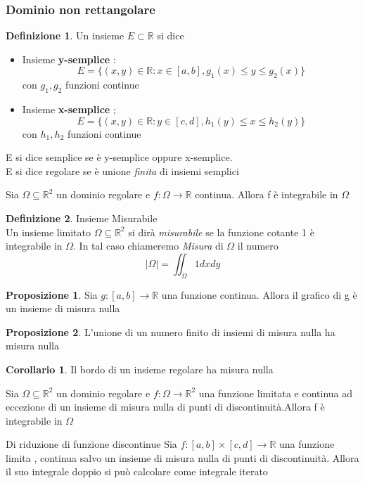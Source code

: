 \documentclass{article}
\theoremstyle{definition}
\newtheorem*{definizione}{Definizione}
\newtheorem*{corollario}{Corollario}
\newtheorem*{proposizione}{Proposizione}
\newcommand{\R}{\mathbb{R}}
\begin{document}
	\subsubsection{Dominio non rettangolare}
	\begin{definizione}
		Un insieme $E \subset \R$ si dice 
		\begin{itemize}
			\item Insieme \textbf{y-semplice} : 
			$$E=\{(x,y)\in \R : x \in [a,b],g_1(x)\leq y \leq g_2(x)\}$$
			con $g_1,g_2$ funzioni continue 
			\item Insieme\textbf{ x-semplice} ;
			$$E=\{(x,y)\in \R : y \in [c,d],h_1(y)\leq x \leq h_2(y)\}$$
			con $h_1,h_2$ funzioni continue 
			
		\end{itemize}
		E si dice semplice se è y-semplice oppure x-semplice.\\
		E si dice regolare se è unione \textit{finita} di insiemi semplici
	\end{definizione}
	\begin{teo}{}{}
		Sia $\Omega \subseteq \R^2$ un dominio regolare e $f : \Omega \rightarrow \R$ continua. Allora f è integrabile in $\Omega$
	\end{teo}
	\begin{definizione}
		Insieme Misurabile \\
		Un insieme limitato $\Omega \subseteq \R^2$ si dirà \textit{misurabile} se la funzione cotante 1 è integrabile in $\Omega$. In tal caso chiameremo \textit{Misura} di $\Omega$ il numero $$|\Omega|=\iint_{\Omega}1dxdy$$
	\end{definizione}
	\begin{proposizione}
		Sia $g:[a,b]\rightarrow\R $ una funzione continua. Allora il grafico di g è un insieme di misura  nulla
	\end{proposizione}
	\begin{proposizione}
		L'unione di un numero finito di insiemi di misura nulla ha misura nulla
	\end{proposizione}
	\begin{corollario}
		Il bordo di un insieme  regolare ha misura nulla 
	\end{corollario}
	\begin{teo}{}{}
		Sia $\Omega\subseteq \R^2$ un dominio regolare e $f:\Omega \rightarrow \R^2$ una funzione limitata e continua ad eccezione di un insieme di misura nulla di punti di discontinuità.Allora f è integrabile in $\Omega$
	\end{teo}
	\begin{teo}{Di riduzione di funzione discontinue }{}
		Sia $f:[a,b]\times [c,d] \rightarrow \R$ una funzione limita , continua salvo un insieme di misura nulla di punti di discontinuità. Allora il suo integrale doppio si può calcolare come integrale iterato 
	\end{teo}
\end{document}

